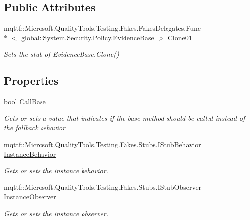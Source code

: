 \subsection*{Public Attributes}
\begin{DoxyCompactItemize}
\item 
mqttf\-::\-Microsoft.\-Quality\-Tools.\-Testing.\-Fakes.\-Fakes\-Delegates.\-Func\\*
$<$ global\-::\-System.\-Security.\-Policy.\-Evidence\-Base $>$ \hyperlink{class_system_1_1_security_1_1_policy_1_1_fakes_1_1_stub_evidence_base_a0bfe23691713eb5e76740e07ae8aef64}{Clone01}
\begin{DoxyCompactList}\small\item\em Sets the stub of Evidence\-Base.\-Clone()\end{DoxyCompactList}\end{DoxyCompactItemize}
\subsection*{Properties}
\begin{DoxyCompactItemize}
\item 
bool \hyperlink{class_system_1_1_security_1_1_policy_1_1_fakes_1_1_stub_evidence_base_a32670a0e8868bc3ef62131763e61c620}{Call\-Base}
\begin{DoxyCompactList}\small\item\em Gets or sets a value that indicates if the base method should be called instead of the fallback behavior\end{DoxyCompactList}\item 
mqttf\-::\-Microsoft.\-Quality\-Tools.\-Testing.\-Fakes.\-Stubs.\-I\-Stub\-Behavior \hyperlink{class_system_1_1_security_1_1_policy_1_1_fakes_1_1_stub_evidence_base_aeb5185e82b009d1575d1d4cffaa53332}{Instance\-Behavior}
\begin{DoxyCompactList}\small\item\em Gets or sets the instance behavior.\end{DoxyCompactList}\item 
mqttf\-::\-Microsoft.\-Quality\-Tools.\-Testing.\-Fakes.\-Stubs.\-I\-Stub\-Observer \hyperlink{class_system_1_1_security_1_1_policy_1_1_fakes_1_1_stub_evidence_base_a774bdb3224d940b43f06c164aba1e622}{Instance\-Observer}
\begin{DoxyCompactList}\small\item\em Gets or sets the instance observer.\end{DoxyCompactList}\end{DoxyCompactItemize}


